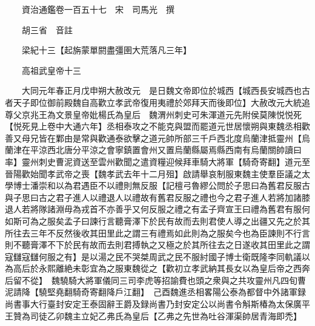 










 


 
 


 

  
  
  
  
  





  
  
  
  
  
 
  

  

  
  
  



  

 
 

  
   




  

  
  


  　　資治通鑑卷一百五十七　宋　司馬光　撰

　　胡三省　音註

　　梁紀十三【起旃蒙單閼盡彊圉大荒落凡三年】

　　高祖武皇帝十三

　　大同元年春正月戊申朔大赦改元　是日魏文帝即位於城西【城西長安城西也古者天子即位御前殿魏自高歡立孝武帝復用夷禮於郊拜天而後即位】大赦改元大統追尊父京兆王為文景皇帝妣楊氏為皇后　魏渭州刺史可朱渾道元先附侯莫陳悦悦死【悦死見上卷中大通六年】丞相泰攻之不能克與盟而罷道元世居懷朔與東魏丞相歡善又母兄皆在鄴由是常與歡通泰欲擊之道元帥所部三千戶西北度烏蘭津抵靈州【烏蘭津在平涼西北唐分平涼之會寧鎮置會州又置烏蘭縣屬焉縣西南有烏蘭關帥讀曰率】靈州刺史曹泥資送至雲州歡聞之遣資糧迎候拜車騎大將軍【騎奇寄翻】道元至晉陽歡始聞孝武帝之喪【魏孝武去年十二月殂】啟請舉哀制服東魏主使羣臣議之太學博士潘崇和以為君遇臣不以禮則無反服【記檀弓魯繆公問於子思曰為舊君反服古與子思曰古之君子進人以禮退人以禮故有舊君反服之禮也今之君子進人若將加諸膝退人若將隊諸淵毋為戎首不亦善乎又何反服之禮之有孟子齊宣王曰禮為舊君有服何如斯可為之服矣孟子曰諫行言聽膏澤下於民有故而去則君使人導之出疆又先之於其所往去三年不反然後收其田里此之謂三有禮焉如此則為之服矣今也為臣諫則不行言則不聽膏澤不下於民有故而去則君搏執之又極之於其所往去之日遂收其田里此之謂寇讎寇讎何服之有】是以湯之民不哭桀周武之民不服紂國子博士衛既隆李同軌議以為高后於永熙離絶未彰宜為之服東魏從之【歡初立孝武納其長女以為皇后帝之西奔后留不從】　魏驍騎大將軍儀同三司李虎等招諭費也頭之衆與之共攻靈州凡四旬曹泥請降【驍堅堯翻騎奇寄翻降戶江翻】　己酉魏進丞相畧陽公泰為都督中外諸軍録尚書事大行臺封安定王泰固辭王爵及録尚書乃封安定公以尚書令斛斯椿為太保廣平王贊為司徒乙卯魏主立妃乙弗氏為皇后【乙弗之先世為吐谷渾渠帥居青海即禿】

